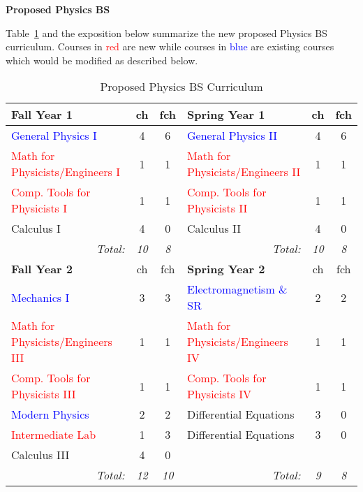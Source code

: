 \documentclass[12pt,preprint]{aastex}
\newcommand{\red}[1]{\textcolor{red}{#1}}
\newcommand{\blue}[1]{\textcolor{blue}{#1}}
\begin{document}
\vspace{2mm}
{\large \sc \textbf{Proposed Physics BS}}

Table~\ref{table:bs} and the exposition below summarize the new proposed Physics
BS curriculum.  Courses in \red{red} are new while courses in \blue{blue} are
existing courses which would be modified as described below.

\newpage

\begin{longtable}{lcclcc}
\caption{Proposed Physics BS Curriculum}\label{table:bs} \\
\hline
{\bf Fall Year 1} & {\sc ch} & {\sc fch} & {\bf Spring Year 1} & {\sc ch} & {\sc fch}  \\ 
\hline
\hline
\blue{General Physics I}                   & 4 & 6 & \blue{General Physics II} & 4 & 6 \\
\red{Math for Physicists/Engineers I}      & 1 & 1 & \red{Math for Physicists/Engineers II} & 1 & 1 \\ 
\red{Comp. Tools for Physicists I} & 1 & 1 & \red{Comp. Tools for Physicists II} & 1 & 1 \\ 
Calculus I                                 & 4 & 0 & Calculus II & 4 & 0 \\
\multicolumn{1}{r}{\emph{Total:}} & \emph{10} & \emph{8} &
\multicolumn{1}{r}{\emph{Total:}} & \emph{10} & \emph{8} \\

\hline
{\bf Fall Year 2} & {\sc ch} & {\sc fch} & {\bf Spring Year 2} & {\sc ch} & {\sc fch} \\ 
\hline
\hline
\blue{Mechanics I}                           & 3 & 3 & \blue{Electromagnetism \&   SR} & 2 & 2 \\
\red{Math for Physicists/Engineers III}      & 1 & 1 & \red{Math for Physicists/Engineers IV} & 1 & 1 \\ 
\red{Comp. Tools for Physicists III} & 1 & 1 & \red{Comp. Tools for Physicists IV} & 1 & 1 \\ 
\blue{Modern Physics}                        & 2 & 2 & Differential Equations    & 3 & 0 \\
\red{Intermediate Lab}                       & 1 & 3 & Differential Equations    & 3 & 0 \\
Calculus III                                 & 4 & 0 &                           &   &   \\
\multicolumn{1}{r}{\emph{Total:}} & \emph{12} & \emph{10} &
\multicolumn{1}{r}{\emph{Total:}} & \emph{9}  & \emph{8} \\


\end{longtable}
\end{document}
